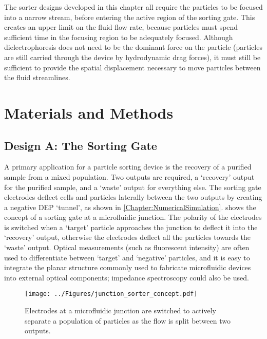 The sorter designs developed in this chapter all require the particles to be focused into a narrow stream, before entering the active region of the sorting gate. This creates an upper limit on the fluid flow rate, because particles must spend sufficient time in the focusing region to be adequately focused. Although dielectrophoresis does not need to be the dominant force on the particle (particles are still carried through the device by hydrodynamic drag forces), it must still be sufficient to provide the spatial displacement necessary to move particles between the fluid streamlines.


\section{Materials and Methods}

\subsection{Design A: The Sorting Gate}

A primary application for a particle sorting device is the recovery of a purified sample from a mixed population. Two outputs are required, a `recovery' output for the purified sample, and a `waste' output for everything else. The sorting gate electrodes deflect cells and particles laterally between the two outputs by creating a negative DEP `tunnel', as shown in \cref{Chapter:NumericalSimulation}.  shows the concept of a sorting gate at a microfluidic junction. The polarity of the electrodes is switched when a `target' particle approaches the junction to deflect it into the `recovery' output, otherwise the electrodes deflect all the particles towards the `waste' output. Optical measurements (such as fluorescent intensity) are often used to differentiate between `target' and `negative' particles, and it is easy to integrate the planar structure commonly used to fabricate microfluidic devices into external optical components; impedance spectroscopy could also be used.

\begin{figure}
 \centering
 \texttt{[image: ../Figures/junction\_sorter\_concept.pdf]}
 \caption[Concept schematic of a dielectrophoretic sorting gate at a fluidic junction.]{Electrodes at a microfluidic junction are switched to actively separate a population of particles as the flow is split between two outputs.}
 \label{fig:junction_sorter_concept}
\end{figure}

